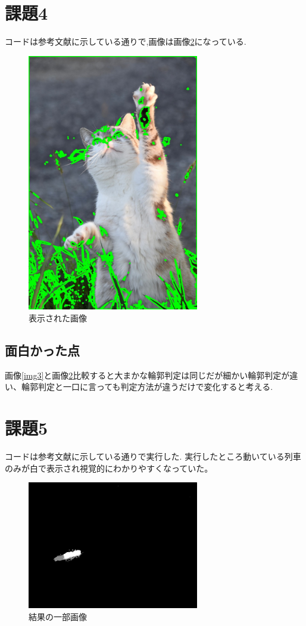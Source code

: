 \documentclass[a4paper, 11pt]{jsarticle}
\begin{document}
\section{課題4}
コードは参考文献\cite{four}に示している通りで,画像は画像\ref{img6}になっている.
\begin{figure}[htbp]
  \begin{center}
    \includegraphics[width=75mm]{rinkaku.jpg}
    \caption{表示された画像}
    \label{img6}
  \end{center}
\end{figure}

\subsection{面白かった点}
画像\ref{img3}と画像\ref{img6}比較すると大まかな輪郭判定は同じだが細かい輪郭判定が違い、輪郭判定と一口に言っても判定方法が違うだけで変化すると考える.

\section{課題5}
コードは参考文献\cite{five}に示している通りで実行した.
実行したところ動いている列車のみが白で表示され視覚的にわかりやすくなっていた。
\begin{figure}[htbp]
  \begin{center}
    \includegraphics[width=75mm]{train.png}
    \caption{結果の一部画像}
    \label{img6}
  \end{center}
\end{figure}
\end{document}
